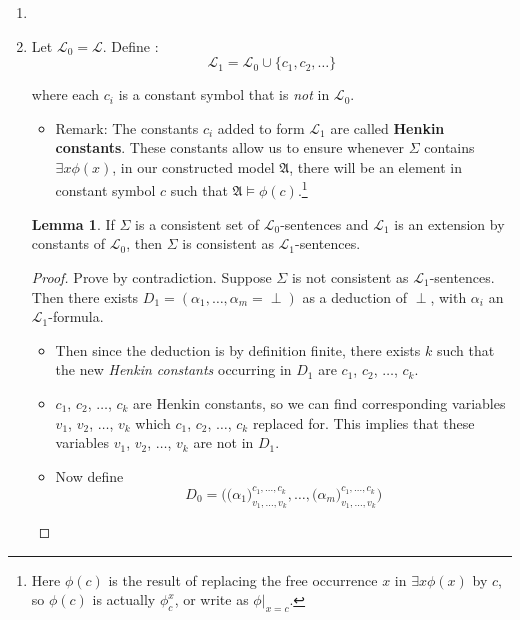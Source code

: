 \documentclass[11pt,letterpaper]{book}
\theoremstyle{definition}
\newtheorem{lemma}{Lemma}[section]
\begin{document}
\begin{enumerate}
\item[]
\item{Let $\mathcal{L}_0 = \mathcal{L}$.  Define :
$$ \mathcal{L}_1 = \mathcal{L}_0 \cup \{ c_1, c_2, \ldots \} $$

where each $c_i$ is a constant symbol that is \emph{not} in $\mathcal{L}_0$.
}
\begin{itemize}
\item{Remark: The constants $c_i$ added to form $ \mathcal{L}_1$ are
called \textbf{Henkin constants}. These constants allow us to ensure
whenever $\Sigma$ contains $\exists x \phi(x)$, in our constructed model
$\mathfrak{A}$, there will be an element in constant symbol $c$ such
that $\mathfrak{A} \models \phi(c)$.\footnote{Here $\phi(c)$ is the
result of replacing the free occurrence $x$ in $\exists x \phi(x)$ by
$c$, so $\phi(c)$ is actually $\phi_c ^x$, or write as $\phi|_{x=c}$.}}
\end{itemize}

\begin{lemma}\label{lemma:consistent_extension_by_constants}
If $\Sigma$ is a consistent set of $\mathcal{L}_0$-sentences and
$\mathcal{L}_1$ is an extension by constants of $\mathcal{L}_0$, then
$\Sigma$ is consistent as $\mathcal{L}_1$-sentences.
\end{lemma}

\begin{proof}
Prove by contradiction. Suppose $\Sigma$ is not consistent as
$\mathcal{L}_1$-sentences. Then there exists $D_1 = (  \alpha_1, \ldots,
\alpha_m = \perp )$ as a deduction of $\perp$, with $\alpha_i$ an
$\mathcal{L}_1$-formula.
\begin{itemize}
\item{Then since the deduction is by definition finite, there exists $k$ 
such that the new \emph{Henkin constants}
occurring in $D_1$ are $c_1$, $c_2$, $\ldots$, $c_k$.}
\item{$c_1$, $c_2$, $\ldots$, $c_k$ are Henkin constants, so we can find
corresponding variables $v_1$, $v_2$, $\ldots$, $v_k$ which $c_1$,
$c_2$, $\ldots$, $c_k$ replaced for. This implies that these variables
$v_1$, $v_2$, $\ldots$, $v_k$ are not in $D_1$.}
\item{Now define
$$ D_0 = \Bigg( \big( \alpha_1 \big)_{v_1, \ldots, v_k} ^{c_1, \ldots,
c_k}, \ldots, \big( \alpha_m \big)_{v_1, \ldots, v_k} ^{c_1, \ldots,
c_k} \Bigg) $$

}
\end{itemize}
\end{proof}
\end{enumerate}
\end{document}
